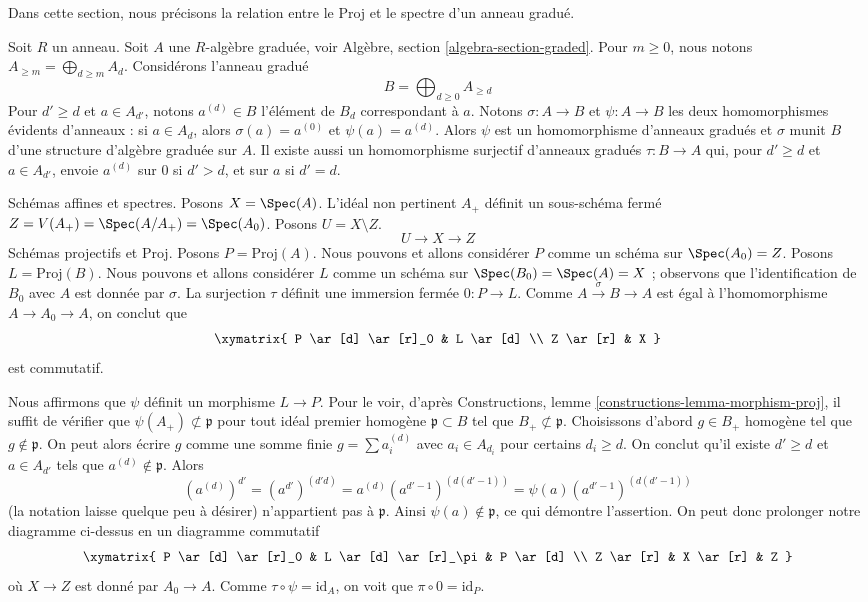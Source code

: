 \noindent
Dans cette section, nous précisons la relation entre le Proj et le spectre
d'un anneau gradué.

\medskip\noindent
Soit $R$ un anneau. Soit $A$ une $R$-algèbre graduée, voir
Algèbre, section \ref{algebra-section-graded}.
Pour $m \geq 0$, nous notons $A_{\geq m} = \bigoplus_{d \geq m} A_d$.
Considérons l'anneau gradué
$$
B = \bigoplus\nolimits_{d \geq 0} A_{\geq d}
$$
Pour $d' \geq d$ et $a \in A_{d'}$, notons $a^{(d)} \in B$
l'élément de $B_d$ correspondant à $a$.
Notons $\sigma : A \to B$ et $\psi : A \to B$
les deux homomorphismes évidents d'anneaux : si $a \in A_d$, alors
$\sigma(a) = a^{(0)}$ et $\psi(a) = a^{(d)}$.
Alors $\psi$ est un homomorphisme d'anneaux gradués et $\sigma$ munit $B$
d'une structure d'algèbre graduée sur $A$. Il existe aussi un
homomorphisme surjectif d'anneaux gradués $\tau : B \to A$
qui, pour $d' \geq d$ et $a \in A_{d'}$, envoie
$a^{(d)}$ sur $0$ si $d' > d$, et sur $a$ si $d' = d$.

\medskip\noindent
Schémas affines et spectres.
Posons $X = \Spec(A)$. L'idéal non pertinent $A_+$ définit un sous-schéma fermé
$Z = V(A_+) = \Spec(A/A_+) = \Spec(A_0)$. Posons $U = X \setminus Z$.
$$
U \longrightarrow X \longrightarrow Z
$$
Schémas projectifs et Proj. Posons $P = \text{Proj}(A)$. Nous pouvons
et allons considérer $P$ comme un schéma sur $\Spec(A_0) = Z$.
Posons $L = \text{Proj}(B)$. Nous pouvons et allons considérer $L$ comme un schéma
sur $\Spec(B_0) = \Spec(A) = X$ ; observons que l'identification
de $B_0$ avec $A$ est donnée par $\sigma$.
La surjection $\tau$ définit une immersion fermée $0 : P \to L$.
Comme $A \xrightarrow{\sigma} B \to A$ est égal à l'homomorphisme $A \to A_0 \to A$,
on conclut que
$$
\xymatrix{
P \ar[d] \ar[r]_0 & L \ar[d] \\
Z \ar[r] & X
}
$$
est commutatif.

\medskip\noindent
Nous affirmons que $\psi$ définit un morphisme $L \to P$.
Pour le voir, d'après Constructions, lemme \ref{constructions-lemma-morphism-proj},
il suffit de vérifier que $\psi(A_+) \not \subset \mathfrak p$ pour
tout idéal premier homogène
$\mathfrak p \subset B$ tel que $B_+ \not \subset \mathfrak p$.
Choisissons d'abord $g \in B_+$ homogène tel que $g \not \in \mathfrak p$.
On peut alors écrire $g$ comme une somme finie $g = \sum a_i^{(d)}$
avec $a_i \in A_{d_i}$ pour certains $d_i \geq d$.
On conclut qu'il existe $d' \geq d$ et $a \in A_{d'}$
tels que $a^{(d)} \not \in \mathfrak p$.
Alors
$$
(a^{(d)})^{d'} =
(a^{d'})^{(d'd)} =
a^{(d)} (a^{d' - 1})^{(d(d' - 1))} =
\psi(a) (a^{d' - 1})^{(d(d' - 1))}
$$
(la notation laisse quelque peu à désirer) n'appartient pas à $\mathfrak p$.
Ainsi $\psi(a) \not \in \mathfrak p$, ce qui démontre l'assertion.
On peut donc prolonger notre diagramme ci-dessus en un diagramme commutatif
$$
\xymatrix{
P \ar[d] \ar[r]_0 & L \ar[d] \ar[r]_\pi & P \ar[d] \\
Z \ar[r] & X \ar[r] & Z
}
$$
où $X \to Z$ est donné par $A_0 \to A$.
Comme $\tau \circ \psi = \text{id}_A$, on voit que $\pi \circ 0 = \text{id}_P$.

